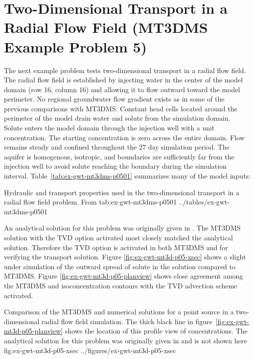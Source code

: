 \section{Two-Dimensional Transport in a Radial Flow Field (MT3DMS Example Problem 5)}

The next example problem tests two-dimensional transport in a radial flow field.  The radial flow field is established by injecting water in the center of the model domain (row 16, column 16) and allowing it to flow outward toward the model perimeter. No regional groundwater flow gradient exists as in some of the previous comparisons with MT3DMS. Constant head cells located around the perimeter of the model drain water and solute from the simulation domain. Solute enters the model domain through the injection well with a unit concentration.  The starting concentration is zero across the entire domain. Flow remains steady and confined throughout the 27 day simulation period. The aquifer is homogenous, isotropic, and boundaries are sufficiently far from the injection well to avoid solute reaching the boundary during the simulation interval. Table~\ref{tab:ex-gwt-mt3dms-p0501} summarizes many of the model inputs:

\begin{StandardTable}
	{Hydraulic and transport properties used in the two-dimensional transport in a radial flow field problem.  From \cite{zheng1999mt3dms}}
	{tab:ex-gwt-mt3dms-p0501}
	{../tables/ex-gwt-mt3dms-p0501}
\end{StandardTable}

An analytical solution for this problem was originally given in \cite{moench1981}. The MT3DMS solution with the TVD option activated most closely matched the analytical solution.  Therefore the TVD option is activated in both MT3DMS and \mf for verifying the transport solution. Figure \ref{fig:ex-gwt-mt3d-p05-xsec} shows a slight under simulation of the outward spread of solute in the \mf solution compared to MT3DMS. Figure \ref{fig:ex-gwt-mt3d-p05-planview} shows close agreement among the MT3DMS and \mf isoconcentration contours with the TVD advection scheme activated. 

\begin{StandardFigure}
	{Comparison of the MT3DMS and \mf numerical solutions for a point source in a two-dimensional radial flow field simulation.  The thick black line in figure~\ref{fig:ex-gwt-mt3d-p05-planview} shows the location of this profile view of concentrations.  The analytical solution for this problem was originally given in \citep{moench1981} and is not shown here} 
	{fig:ex-gwt-mt3d-p05-xsec}
	{../figures/ex-gwt-mt3d-p05-xsec}
\end{StandardFigure}

